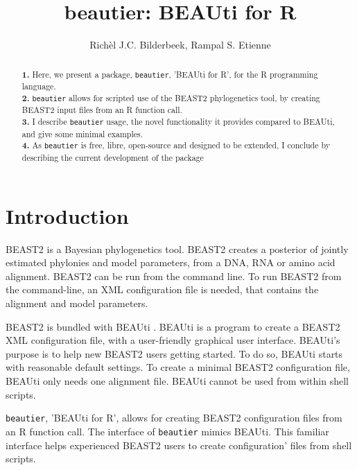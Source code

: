 \documentclass{article}
\title{beautier: BEAUti for R}
\author{Rich\`el J.C. Bilderbeek, Rampal S. Etienne}
\begin{document}
\maketitle

\begin{abstract}
  \textbf{1. }
  Here, we present a package, \verb;beautier;, 'BEAUti for R', for the R programming language. \\
  \textbf{2. }
    \verb;beautier; allows for scripted use of the BEAST2 phylogenetics tool, 
    by creating BEAST2 input files from an R function call. \\
  \textbf{3. }
    I describe \verb;beautier; usage, the novel functionality it provides
    compared to BEAUti, and give some minimal examples. \\
  \textbf{4. }
    As \verb;beautier; is free, libre, open-source and designed to be extended, 
    I conclude by describing the current development of the package \\
\end{abstract}


\section{Introduction}

BEAST2 \cite{bouckaert2014beast} is a Bayesian phylogenetics tool.
BEAST2 creates a posterior of jointly estimated phylonies and model
parameters, from a DNA, RNA or amino acid alignment. BEAST2 can be run
from the command line. To run BEAST2 from the command-line, 
an XML configuration file is needed, that contains the alignment and model parameters.

BEAST2 is bundled with BEAUti \cite{drummond2012bayesian}. 
BEAUti is a program to create a BEAST2 XML configuration file, 
with a user-friendly graphical user interface.
BEAUti's purpose is to help new BEAST2 users getting started.
To do so, BEAUti starts with reasonable default settings. To
create a minimal BEAST2 configuration file, BEAUti only needs one alignment file.
BEAUti cannot be used from within shell scripts.

\verb;beautier;, 'BEAUti for R', allows for creating BEAST2 configuration files 
from an R function call. The interface of \verb;beautier; mimics BEAUti. This
familiar interface helps experienced BEAST2 users to create configuration'
files from shell scripts.
\end{document}

